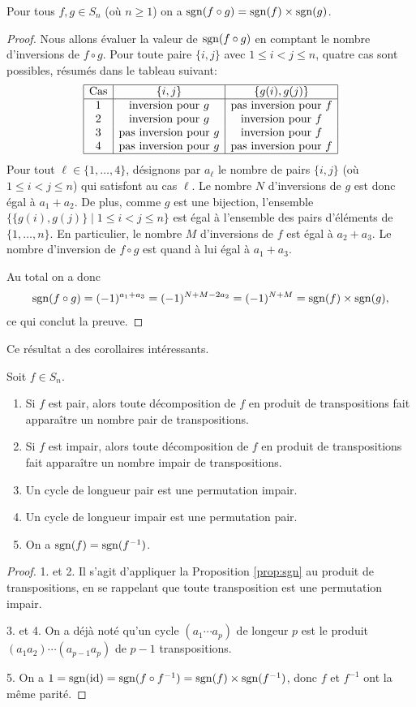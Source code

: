 \documentclass[french,course,oneside,theoremnosection]{lecture}
\begin{document}
\begin{proposition}\label{prop:sgn}
Pour tous $f,g\in S_n$ (où $n\geq 1$) on a $\operatorname{sgn}(f\circ g)=\operatorname{sgn}(f)\times \operatorname{sgn}(g)$.
\end{proposition}
\begin{proof}
Nous allons évaluer la valeur de $\operatorname{sgn}(f\circ g)$ en comptant le nombre d'inversions de $f\circ g$. Pour toute paire $\{i,j\}$ avec $1 \leq i <j \leq n$, quatre cas sont possibles, résumés dans le tableau suivant:
\[
\begin{array}{|c|c|c|}\hline
\text{Cas}& \{i,j\} &\{g(i),g(j)\}\\\hline
1 & \text{inversion pour } g & \text{pas inversion pour }f \\
2 & \text{inversion pour } g & \text{inversion pour }f \\
3 & \text{pas inversion pour } g & \text{inversion pour }f \\
4 & \text{pas inversion pour } g & \text{pas inversion pour }f \\\hline
\end{array}
\]
Pour tout $\ell \in \{1, \ldots, 4\}$, désignons par $a_\ell$ le nombre de pairs $\{i,j\}$ (où $1\leq i < j \leq n$) qui satisfont au cas $\ell$. Le nombre $N$ d'inversions de $g$ est donc égal à $a_1+a_2$. De plus, comme $g$ est une bijection, l'ensemble $\{\{g(i), g(j)\}\mid 1\leq i < j \leq n\}$ est égal à l'ensemble des pairs d'éléments de $\{1, \ldots, n\}$. En particulier, le nombre $M$ d'inversions de $f$ est égal à $a_2+a_3$. Le nombre d'inversion de $f\circ g$ est quand à lui égal à $a_1+a_3$.

Au total on a donc
\[
\operatorname{sgn}(f\circ g)= (-1)^{a_1+a_3}=(-1)^{N+M-2a_2}=(-1)^{N+M}=\operatorname{sgn}(f)\times \operatorname{sgn}(g),
\]
ce qui conclut la preuve.
\end{proof}
Ce résultat a des corollaires intéressants.
\begin{corollary}
Soit $f\in S_n$.
\begin{enumerate}
\item Si $f$ est pair, alors toute décomposition de $f$ en produit de transpositions fait apparaître un nombre pair de transpositions.
\item Si $f$ est impair, alors toute décomposition de $f$ en produit de transpositions fait apparaître un nombre impair de transpositions.
\item Un cycle de longueur pair est une permutation impair.
\item Un cycle de longueur impair est une permutation pair.
\item On a $\operatorname{sgn}(f)=\operatorname{sgn}(f^{-1})$.
\end{enumerate}
\end{corollary}
\begin{proof}
1. et 2. Il s'agit d'appliquer la Proposition \ref{prop:sgn} au produit de transpositions, en se rappelant que toute transposition est une permutation impair.

3. et 4. On a déjà noté qu'un cycle $(a_1\cdots a_p)$ de longeur $p$ est le produit $(a_1a_2)\cdots (a_{p-1}a_p)$ de $p-1$ transpositions.

5. On a $1=\operatorname{sgn}(\operatorname{id})=\operatorname{sgn}(f\circ f^{-1})=\operatorname{sgn}(f) \times \operatorname{sgn}(f^{-1})$, donc $f$ et $f^{-1}$ ont la même parité.
\end{proof}
\end{document}
